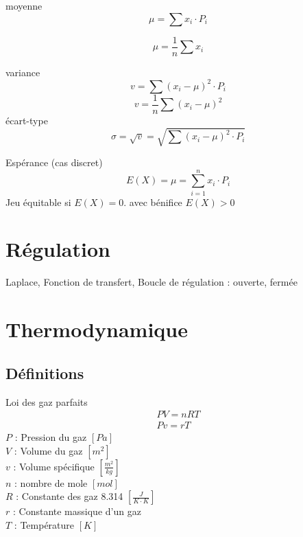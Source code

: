 \documentclass[12pt,a4paper,twoside]{article}
\numberwithin{equation}{subsection}
\begin{document}
moyenne
\begin{equation}
\mu=\sum x_i \cdot P_i
\end{equation}

\begin{equation}
\mu = \frac{1}{n}\sum x_i
\end{equation}

variance
\begin{equation}
v=\sum (x_i-\mu)^2\cdot P_i
\end{equation}
\begin{equation}
v=\frac{1}{n} \sum (x_i-\mu)^2
\end{equation}
écart-type
\begin{equation}
\sigma=\sqrt{v}=\sqrt{\sum (x_i-\mu)^2\cdot P_i}
\end{equation}

Espérance (cas discret)
\begin{equation}
E(X)=\mu=\sum_{i=1}^{n}x_i\cdot P_i
\end{equation}
Jeu équitable si $E(X)=0$. avec bénifice $E(X)>0$

\newpage
\section{Régulation}

Laplace, Fonction de transfert, Boucle de régulation : ouverte, fermée

\newpage
\section{Thermodynamique}
\subsection{Définitions}
Loi des gaz parfaits
\begin{eqnarray}
PV=nRT\\
Pv=rT
\end{eqnarray}
$P$ : Pression du gaz $[Pa]$\\
$V$ : Volume du gaz $[m^2]$\\
$v$ : Volume spécifique $[\frac{m^2}{kg}]$\\
$n$ : nombre de mole $[mol]$\\
$R$ : Constante des gaz 8.314 $[\frac{J}{K \cdot K}]$\\
$r$ : Constante massique d'un gaz \\
$T$ : Température $[K]$\\
\end{document}
